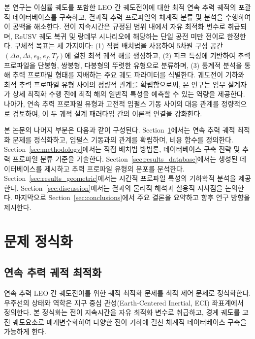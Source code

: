 \documentclass[a4paper,fleqn]{cas-dc}
\let\origsubsection\subsection
\renewcommand{\subsection}{\FloatBarrier\origsubsection}
\begin{document}
본 연구는 이심률 궤도를 포함한 LEO 간 궤도전이에 대한 최적 연속 추력 궤적의 포괄적 데이터베이스를 구축하고, 결과적 추력 프로파일의 체계적 분류 및 분석을 수행하여 이 공백을 해소한다. 전이 지속시간은 규정된 범위 내에서 자유 최적화 변수로 취급되며, ReUSV 궤도 복귀 및 랑데부 시나리오에 해당하는 단일 공전 미만 전이로 한정한다. 구체적 목표는 세 가지이다: (1) 직접 배치법을 사용하여 5차원 구성 공간 $(\Delta a, \Delta i, e_0, e_f, T_f)$에 걸친 최적 궤적 해를 생성하고, (2) 피크 특성에 기반하여 추력 프로파일을 단봉형, 쌍봉형, 다봉형의 뚜렷한 유형으로 분류하며, (3) 통계적 분석을 통해 추력 프로파일 형태를 지배하는 주요 궤도 파라미터를 식별한다. 궤도전이 기하와 최적 추력 프로파일 유형 사이의 정량적 관계를 확립함으로써, 본 연구는 임무 설계자가 상세 최적화 수행 전에 최적 해의 일반적 특성을 예측할 수 있는 역량을 제공한다. 나아가, 연속 추력 프로파일 유형과 고전적 임펄스 기동 사이의 대응 관계를 정량적으로 검토하여, 이 두 궤적 설계 패러다임 간의 이론적 연결을 강화한다.

본 논문의 나머지 부분은 다음과 같이 구성된다. Section~\ref{sec:problem}에서는 연속 추력 궤적 최적화 문제를 정식화하고, 임펄스 기동과의 관계를 확립하며, 비용 함수를 정의한다. Section~\ref{sec:methodology}에서는 직접 배치법 방법론, 데이터베이스 구축 전략 및 추력 프로파일 분류 기준을 기술한다. Section~\ref{sec:results_database}에서는 생성된 데이터베이스를 제시하고 추력 프로파일 유형의 분포를 분석한다. Section~\ref{sec:results_geometric}에서는 시간적 프로파일 특성의 기하학적 분석을 제공한다. Section~\ref{sec:discussion}에서는 결과의 물리적 해석과 실용적 시사점을 논의한다. 마지막으로 Section~\ref{sec:conclusions}에서 주요 결론을 요약하고 향후 연구 방향을 제시한다.


\section{문제 정식화}\label{sec:problem}

\subsection{연속 추력 궤적 최적화}\label{subsec:continuous_thrust}

연속 추력 LEO 간 궤도전이를 위한 궤적 최적화 문제를 최적 제어 문제로 정식화한다. 우주선의 상태와 역학은 지구 중심 관성(Earth-Centered Inertial, ECI) 좌표계에서 정의한다. 본 정식화는 전이 지속시간을 자유 최적화 변수로 취급하고, 경계 궤도를 고전 궤도요소로 매개변수화하여 다양한 전이 기하에 걸친 체계적 데이터베이스 구축을 가능하게 한다.
\end{document}
